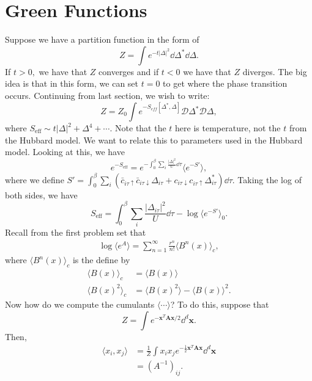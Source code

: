 \documentclass{article}
\numberwithin{equation}{section}
\begin{document}
\section{Green Functions}
Suppose we have a partition function in the form of 
\begin{equation}
    Z = \int e^{-t|\Delta|^2}\dd{\Delta^*}\dd{\Delta}.
\end{equation}
If $t>0,$ we have that $Z$ converges and if $t<0$ we have that $Z$ diverges. The big idea is that in this form, we can set $t=0$ to get where the phase transition occurs. Continuing from last section, we wish to write:
\begin{equation}
    Z = Z_0 \int e^{-S_{eff}[\Delta^*,\Delta]}\mathcal{D}\Delta^*\mathcal{D}\Delta,
\end{equation}
where $S_\text{eff} \sim t|\Delta|^2 + \Delta^4 + \cdots.$ Note that the $t$ here is temperature, not the $t$ from the Hubbard model. We want to relate this to parameters used in the Hubbard model. Looking at this, we have 
\begin{equation}
    e^{-S_\text{eff}} = e^{-\int_0^\beta \sum_i \frac{|\Delta|^2}{U}\dd{\tau}} \langle e^{-S'}\rangle,
\end{equation}
where we define $S' = \int_0^\beta \sum_i(\bar{c}_{i\tau\uparrow}\bar{c}_{i\tau\downarrow}\Delta_{i\tau} + c_{i\tau\downarrow}c_{i\tau \uparrow}\Delta^*_{i\tau}) \dd{\tau}.$ Taking the log of both sides, we have 
\begin{equation}
    S_\text{eff} = \int_0^\beta \sum_i \frac{|\Delta_{i\tau}|^2}{U}\dd{\tau} - \log \langle e^{-S'}\rangle_0.
\end{equation}
Recall from the first problem set that 
\begin{align}
    \log\langle e^A\rangle = \sum_{n=1}^{\infty} \frac{r^n}{n!}\langle B^n(x) \rangle_c,
\end{align}
where $\langle B^n(x) \rangle_c$ is the  define by 
\begin{align}
    \langle B(x)\rangle_c &= \langle B(x) \rangle \\
    \langle B(x)^2\rangle_c &= \langle B(x)^2\rangle - \langle B(x)\rangle^2.
\end{align}
Now how do we compute the cumulants $\langle \cdots \rangle$? To do this, suppose that 
\begin{equation}
    Z = \int e^{-\bm{x}^T\bm{A}\bm{x}/2} \dd^d{\bm{x}}.
\end{equation}
Then,
\begin{align}
    \langle x_i,x_j\rangle &= \frac{1}{Z} \int x_i x_j e^{-\frac{1}{2}\bm{x}^T\bm{A}\bm{x}}\dd^d{\bm{x}} \\ 
    &= (A^{-1})_{ij}.
\end{align}
\end{document}
